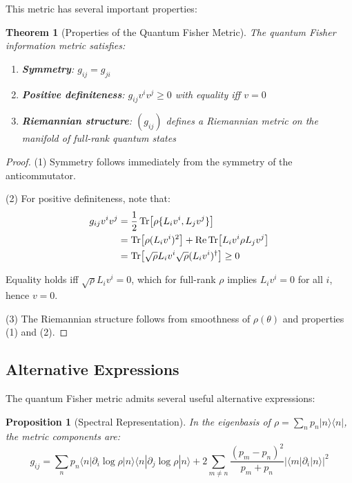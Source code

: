 \documentclass[12pt,a4paper]{article}
\newtheorem{theorem}{Theorem}
\newtheorem{proposition}{Proposition}
\begin{document}
This metric has several important properties:

\begin{theorem}[Properties of the Quantum Fisher Metric]
The quantum Fisher information metric satisfies:
\begin{enumerate}
\item \textbf{Symmetry}: $g_{ij} = g_{ji}$
\item \textbf{Positive definiteness}: $g_{ij}v^i v^j \geq 0$ with equality iff $v = 0$
\item \textbf{Riemannian structure}: $(g_{ij})$ defines a Riemannian metric on the manifold of full-rank quantum states
\end{enumerate}
\end{theorem}

\begin{proof}
(1) Symmetry follows immediately from the symmetry of the anticommutator.

(2) For positive definiteness, note that:
\begin{align}
g_{ij}v^i v^j &= \frac{1}{2}\Tr[\rho\{L_i v^i, L_j v^j\}] \\
&= \Tr[\rho (L_i v^i)^2] + \Re\Tr[L_i v^i \rho L_j v^j] \\
&= \Tr[\sqrt{\rho}L_i v^i \sqrt{\rho}(L_i v^i)^\dagger] \geq 0
\end{align}

Equality holds iff $\sqrt{\rho}L_i v^i = 0$, which for full-rank $\rho$ implies $L_i v^i = 0$ for all $i$, hence $v = 0$.

(3) The Riemannian structure follows from smoothness of $\rho(\theta)$ and properties (1) and (2).
\end{proof}

\subsection{Alternative Expressions}

The quantum Fisher metric admits several useful alternative expressions:

\begin{proposition}[Spectral Representation]
In the eigenbasis of $\rho = \sum_n p_n |n\rangle\langle n|$, the metric components are:
\begin{equation}
g_{ij} = \sum_n p_n \langle n|\partial_i \log \rho|n\rangle\langle n|\partial_j \log \rho|n\rangle + 2\sum_{m \neq n} \frac{(p_m - p_n)^2}{p_m + p_n}|\langle m|\partial_i|n\rangle|^2
\end{equation}
\end{proposition}
\end{document}
